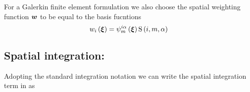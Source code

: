 For a Galerkin finite element formulation we also choose the spatial weighting
function $\vectr{w}$ to be equal to the basis fucntions \ie
\begin{equation}
  \fnof{w_{i}}{\vectr{\xi}}=\idxgbfn{i}{m}{\alpha}{\vectr{\xi}}\idxgsf{i}{m}{\alpha}
\end{equation}

\subsection{Spatial integration:}

Adopting the standard integration notation we can write the spatial
integration term in  as

